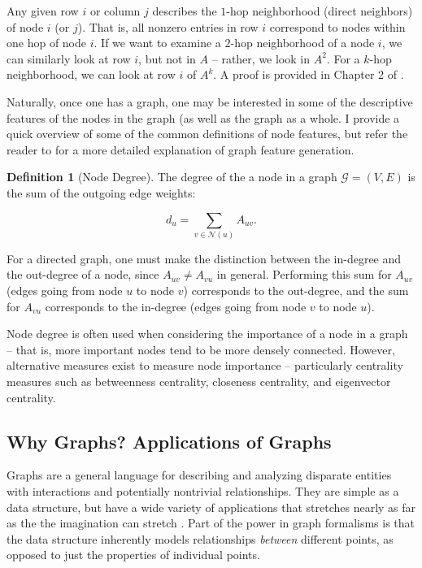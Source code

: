 \documentclass{article}
\theoremstyle{definition}
\newtheorem{definition}{Definition}[section]
\begin{document}
Any given row $i$ or column $j$ describes the $1$-hop neighborhood (direct neighbors) of node $i$ (or $j$). That is, all nonzero entries in row $i$ correspond to nodes within one hop of node $i$. If we want to examine a $2$-hop neighborhood of a node $i$, we can similarly look at row $i$, but not in $A$ -- rather, we look in $A^2$. For a $k$-hop neighborhood, we can look at row $i$ of $A^k$. A proof is provided in Chapter 2 of \cite{hamiltonGRL}.

Naturally, once one has a graph, one may be interested in some of the descriptive features of the nodes in the graph (as well as the graph as a whole. I provide a quick overview of some of the common definitions of node features, but refer the reader to \cite{mdpiGraphFeatureSurvey} for a more detailed explanation of graph feature generation.

\begin{definition}[Node Degree]
The degree of the a node in a graph $\mathcal{G} = (V, E)$ is the sum of the outgoing edge weights:

\[
d_u = \sum_{v \in \mathcal{N}(u)} A_{uv}.
\]

For a directed graph, one must make the distinction between the in-degree and the out-degree of a node, since $A_{uv} \neq A_{vu}$ in general. Performing this sum for $A_{uv}$ (edges going from node $u$ to node $v$) corresponds to the out-degree, and the sum for $A_{vu}$ corresponds to the in-degree (edges going from node $v$ to node $u$).
\end{definition}

Node degree is often used when considering the importance of a node in a graph -- that is, more important nodes tend to be more densely connected. However, alternative measures exist to measure node importance -- particularly centrality measures such as betweenness centrality, closeness centrality, and eigenvector centrality. 

\subsection{Why Graphs? Applications of Graphs}
\label{sec:motivation}

Graphs are a general language for describing and analyzing disparate entities with interactions and potentially nontrivial relationships. They are simple as a data structure, but have a wide variety of applications that stretches nearly as far as the the imagination can stretch \cite{hamiltonGRL}. Part of the power in graph formalisms is that the data structure inherently models relationships \textit{between} different points, as opposed to just the properties of individual points. 
\end{document}
